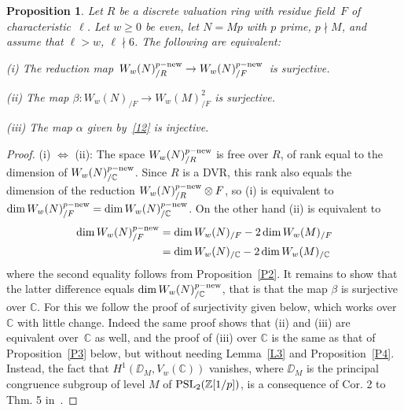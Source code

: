 \documentclass{amsart}
\theoremstyle{plain}
\newtheorem{proposition}[theorem]{Proposition}
\theoremstyle{definition}
\numberwithin{equation}{section}
\newcommand{\Z}{{\mathbb Z}}
\newcommand{\C}{{\mathbb C}}
\def\a{\alpha}\def\b{\beta}\def\g{\gamma}
\def\rar{\rightarrow}\def\FF{\mathbb{F}}
\begin{document}
\begin{proposition}\label{P5} Let $R$ be a discrete valuation ring with residue field~$F$ of 
characteristic~$\ell$. Let $w\ge 0$ be even, let $N=Mp$ with $p$ prime, $p\nmid M$,
and assume that $\ell>w$, $\ell\nmid 6$. The following are equivalent:

\emph{\phantom{ii}(i)} The reduction  map 
$\, W_w(N)_{/R}^{p-\new}\rar W_w(N)_{/F}^{p-\new} \,$
is surjective. 

\emph{\phantom{i}(ii)} The map $\beta: W_w(N)_{/F}\rar W_w(M)^2_{/F} $ is surjective.

\emph{(iii)} The map $\a$ given by~\eqref{12} is injective.
\end{proposition}

\begin{proof} (i) $\Leftrightarrow$ (ii):
The space $W_w(N)_{/R}^{p-\mathrm{new}}$ is free over $R$, of rank equal to the 
dimension of $W_w(N)_{/\C}^{p-\new}$. Since $R$ is a DVR, this rank also 
equals the dimension of the reduction $W_w(N)_{/R}^{p-\mathrm{new}}\otimes F$, so 
(i) is equivalent to $\dim W_w(N)_{/F}^{p-\new}=\dim W_w(N)_{/\C}^{p-\new}$.
On the other hand (ii) is equivalent to 
\[\begin{aligned}
     \dim W_w(N)_{/F}^{p-\new}&=\dim W_w(N)_{/F}-2 \dim W_w(M)_{/F} \\
     &=\dim W_w(N)_{/\C}-2 \dim W_w(M)_{/\C}%
  \end{aligned}
\]
where the second equality follows from Proposition~\ref{P2}. It remains to show that
the latter difference equals $\dim W_w(N)_{/\C}^{p-\new}$, that is that the map $\beta$ 
is surjective over $\C$. For this we follow the proof of surjectivity given below,
which works over $\C$ with little change. Indeed
 the same proof shows that (ii) and (iii) are equivalent over~$\C$ as well, and the proof
 of (iii) over $\C$ is the same as that of Proposition~\ref{P3} below, but without needing Lemma~\ref{L3} and
Proposition~\ref{P4}. Instead, the fact that $H^1(\DD_M, V_w(\C))$ vanishes, where $\DD_M$ is the principal 
congruence subgroup of level $M$ of $\PSL_2(\Z[1/p])$, is a consequence of Cor. 2 to Thm. 5 in~\cite{Se}.


\end{proof}
\end{document}
